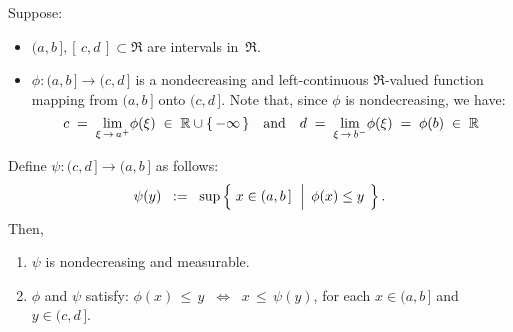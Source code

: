 
\begin{lemma}\label{lemma:partialInversePsi}
\mbox{}\vskip 0.1cm
\noindent
Suppose:
\begin{itemize}
\item
	$(a,b\,], [\,c,d\,] \subset \Re$ are intervals in \,$\Re$.
\item
	$\phi : (a,b\,] \longrightarrow (c,d\,]$ is a nondecreasing and left-continuous
	$\Re$-valued function mapping from $(a,b\,]$ {\color{red}onto} $(c,d\,]$.
	Note that, since $\phi$ is nondecreasing, we have:
	\begin{equation*}
	c \; = \; \underset{\xi\,\rightarrow\,a^{+}}{\lim}\phi(\xi) \; \in \; \Re\cup\{\,-\infty\,\}
	\quad\textnormal{and}\quad
	d \; = \; \underset{\xi\,\rightarrow\,b^{-}}{\lim}\phi(\xi) \; = \; \phi(b) \; \in \; \Re
	\end{equation*}
\end{itemize}
Define \;$\psi : (c,d\,] \longrightarrow (a,b\,]$\; as follows:
\begin{equation*}
\psi(y)
\;\; := \;\;
	\sup\left\{\;
		x \in (a,b\,]
	\,\;\left\vert\;\,
		\overset{{\color{white}.}}{\phi}(x) \leq y
	\right.
	\;\right\}.
\end{equation*}
Then,
\begin{enumerate}
\item
	$\psi$ is nondecreasing and measurable.
\item
	$\phi$ and $\psi$ satisfy:\quad
	$\phi(x) \,\leq\, y \;\; \Longleftrightarrow \;\; x \,\leq\, \psi(y)$,\;\;
	for each \;$x \in (a,b\,]$\; and \;$y \in (c,d\,]$.
\end{enumerate}
\end{lemma}
\proof
